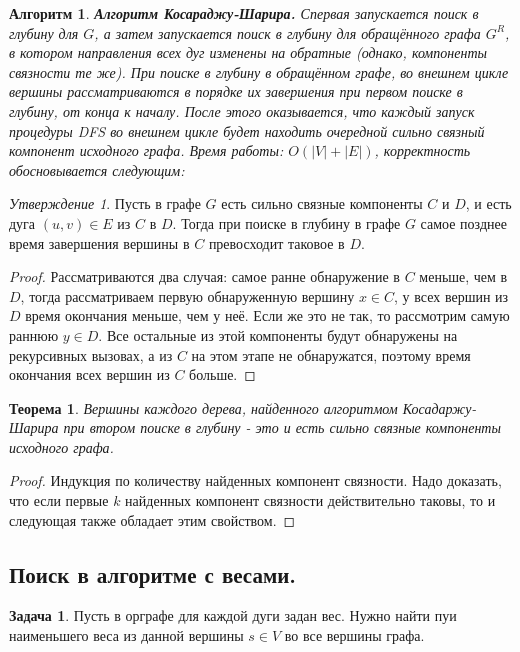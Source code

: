 \documentclass[a4paper]{article}
\theoremstyle{indented}
\newtheorem{theorem}{Теорема}
\newtheorem{alg}{Алгоритм}
\theoremstyle{definition}
\newtheorem{prob}{Задача}
\theoremstyle{remark}
\newtheorem{stat}{Утверждение}
\begin{document}
\begin{alg}
    \textbf{Алгоритм Косараджу-Шарира.} Спервая запускается поиск в глубину для $G$, а затем запускается поиск в глубину для обращённого графа $G^R$, в котором направления всех дуг изменены на обратные (однако, компоненты связности те же). При поиске в глубину в обращённом графе, во внешнем цикле вершины рассматриваются в порядке их завершения при первом поиске в глубину, от конца к началу. После этого оказывается, что каждый запуск процедуры DFS во внешнем цикле будет находить очередной сильно связный компонент исходного графа. Время работы: $O(|V|+|E|)$, корректность обосновывается следующим:
\end{alg}

\begin{stat}
    Пусть в графе $G$ есть сильно связные компоненты $C$ и $D$, и есть дуга $(u, v)\in E$ из $C$ в $D$. Тогда при поиске в глубину в графе $G$ самое позднее время завершения вершины в $C$ превосходит таковое в $D$. 
\end{stat}

\begin{proof}
    Рассматриваются два случая: самое ранне обнаружение в $C$ меньше, чем в $D$, тогда рассматриваем первую обнаруженную вершину $x\in C$, у всех вершин из $D$ время окончания меньше, чем у неё. Если же это не так, то рассмотрим самую раннюю $y\in D$. Все остальные из этой компоненты будут обнаружены на рекурсивных вызовах, а из $C$ на этом этапе не обнаружатся, поэтому время окончания всех вершин из $C$ больше. 
\end{proof}

\begin{theorem}
    Вершины каждого дерева, найденного алгоритмом Косадаржу-Шарира при втором поиске в глубину - это и есть сильно связные компоненты исходного графа. 
\end{theorem}

\begin{proof}
    Индукция по количеству найденных компонент связности. Надо доказать, что если первые $k$ найденных компонент связности действительно таковы, то и следующая также обладает этим свойством.
\end{proof}

\subsection{Поиск в алгоритме с весами.}

\begin{prob}
    Пусть в орграфе для каждой дуги задан вес. Нужно найти пуи наименьшего веса из данной вершины $s\in V$ во все вершины графа.
\end{prob}
\end{document}
